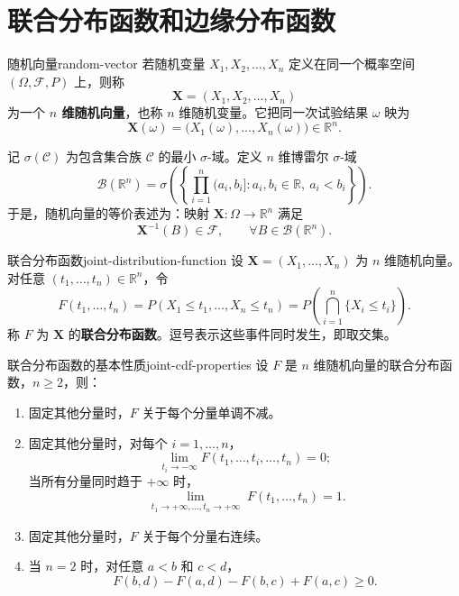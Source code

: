 
\clearpage\section{联合分布函数和边缘分布函数}\label{k:joint}

\begin{mydefinition}{随机向量}{random-vector}
若随机变量 $X_1,X_2,\ldots,X_n$ 定义在同一个概率空间 $(\Omega,\mathcal F,P)$ 上，则称
\[
\boldsymbol X=(X_1,X_2,\ldots,X_n)
\]
为一个 \textbf{$n$ 维随机向量}，也称 $n$ 维随机变量。它把同一次试验结果 $\omega$ 映为
\[
\boldsymbol X(\omega)=\bigl(X_1(\omega),\ldots,X_n(\omega)\bigr)\in\mathbb R^n.
\]
\end{mydefinition}

记 $\sigma(\mathcal C)$ 为包含集合族 $\mathcal C$ 的最小 $\sigma$-域。定义 $n$ 维博雷尔 $\sigma$-域
\[
\mathcal B(\mathbb R^n)
=\sigma\left(
\left\{\prod_{i=1}^n(a_i,b_i]:
a_i,b_i\in\mathbb R,\ a_i<b_i\right\}
\right).
\]
于是，随机向量的等价表述为：映射 $\boldsymbol X:\Omega\to\mathbb R^n$ 满足
\[
\boldsymbol X^{-1}(B)\in\mathcal F,
\qquad \forall B\in\mathcal B(\mathbb R^n).
\]

\begin{mydefinition}{联合分布函数}{joint-distribution-function}
设 $\boldsymbol X=(X_1,\ldots,X_n)$ 为 $n$ 维随机向量。对任意 $(t_1,\ldots,t_n)\in\mathbb R^n$，令
\[
F(t_1,\ldots,t_n)
=P(X_1\leq t_1,\ldots,X_n\leq t_n)
=P\left(\bigcap_{i=1}^n\{X_i\leq t_i\}\right).
\]
称 $F$ 为 $\boldsymbol X$ 的\textbf{联合分布函数}。逗号表示这些事件同时发生，即取交集。
\end{mydefinition}

\begin{proposition}{联合分布函数的基本性质}{joint-cdf-properties}
设 $F$ 是 $n$ 维随机向量的联合分布函数，$n\geq2$，则：
\begin{enumerate}
\item 固定其他分量时，$F$ 关于每个分量单调不减。
\item 固定其他分量时，对每个 $i=1,\ldots,n$，
\[
\lim_{t_i\to-\infty}F(t_1,\ldots,t_i,\ldots,t_n)=0;
\]
当所有分量同时趋于 $+\infty$ 时，
\[
\lim_{\substack{t_1\to+\infty,\ldots,t_n\to+\infty}}
F(t_1,\ldots,t_n)=1.
\]
\item 固定其他分量时，$F$ 关于每个分量右连续。
\item 当 $n=2$ 时，对任意 $a<b$ 和 $c<d$，
\[
F(b,d)-F(a,d)-F(b,c)+F(a,c)\geq0.
\]
\end{enumerate}
\end{proposition}

